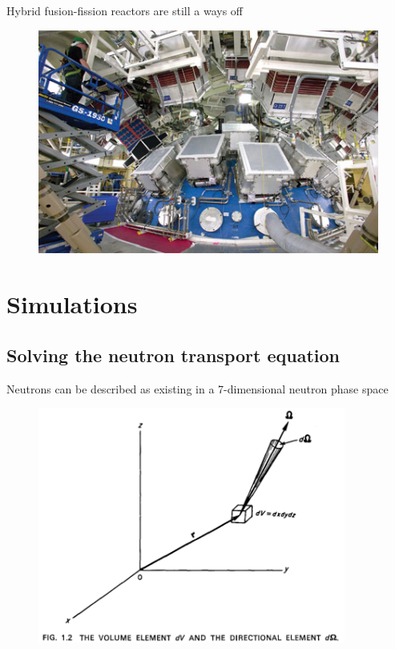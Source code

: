 \documentclass{beamer}
\begin{document}
    \begin{frame}{Hybrid fusion-fission reactors are still a ways off}
        \begin{figure}
            \centering
            \includegraphics[width=1.0\textwidth]{./img/nifChamber.png}
            \caption*{}
        \end{figure}
    \end{frame}

\section{Simulations}

\subsection{Solving the neutron transport equation}

    \begin{frame}{Neutrons can be described as existing in a 7-dimensional neutron phase space}
        \begin{figure}
            \centering
            \includegraphics[width=0.9\textwidth]{./img/phaseSpace.png}
        \end{figure}
    \end{frame}
\end{document}
